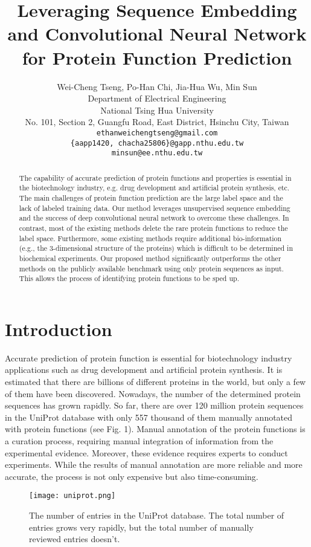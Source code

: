 \documentclass{article}
\title{Leveraging Sequence Embedding and Convolutional Neural Network for Protein Function Prediction}
\author{
    Wei-Cheng Tseng, Po-Han Chi, Jia-Hua Wu, Min Sun \\
    Department of Electrical Engineering\\
    National Tsing Hua University\\
    No. 101, Section 2, Guangfu Road, East District, Hsinchu City, Taiwan \\
    \texttt{ethanweichengtseng@gmail.com} \\
    \texttt{\{aapp1420, chacha25806\}@gapp.nthu.edu.tw}\\
    \texttt{minsun@ee.nthu.edu.tw}
}
\begin{document}

\maketitle

\begin{abstract}
    The capability of accurate prediction of protein functions and properties is essential in the biotechnology industry, e.g. drug development and artificial protein synthesis, etc. The main challenges of protein function prediction are the large label space and the lack of labeled training data. Our method leverages unsupervised sequence embedding and the success of deep convolutional neural network to overcome these challenges. In contrast, most of the existing methods delete the rare protein functions to reduce the label space. Furthermore, some existing methods require additional bio-information (e.g., the 3-dimensional structure of the proteins) which is difficult to be determined in biochemical experiments. Our proposed method significantly outperforms the other methods on the publicly available benchmark using only protein sequences as input. This allows the process of identifying protein functions to be sped up.
\end{abstract}
\section{Introduction}
    Accurate prediction of protein function is essential for biotechnology industry applications such as drug development and artificial protein synthesis. It is estimated that there are billions of different proteins in the world, but only a few of them have been discovered. Nowadays, the number of the determined protein sequences has grown rapidly. So far, there are over 120 million protein sequences in the UniProt database \citep{doi:10.1093/nar/gkw1099} with only 557 thousand of them manually annotated with protein functions (see Fig. 1). Manual annotation of the protein functions is a curation process, requiring manual integration of information from the experimental evidence. Moreover, these evidence requires experts to conduct experiments. While the results of manual annotation are more reliable and more accurate, the process is not only expensive but also time-consuming.

\begin{figure}[h]
	\texttt{[image: uniprot.png]}
	\centering
	\caption{The number of entries in the UniProt database. The total number of entries grows very rapidly, but the total number of manually reviewed entries doesn't.}
\end{figure}
\end{document}
